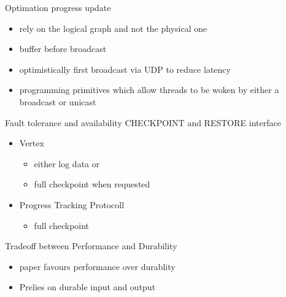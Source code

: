 \begin{frame}[t]{Optimation progress update}
  \vspace{0.15cm}
   \begin{itemize}
     \item rely on the logical graph and not the physical one
     \item buffer before broadcast
	 \item optimistically first broadcast via UDP to reduce latency
     \item programming primitives which allow threads to be woken by either a broadcast or unicast
   \end{itemize}

\end{frame}

 \begin{frame}[t]{Fault tolerance and availability}
  \vspace{0.15cm}
  CHECKPOINT and RESTORE interface
   \begin{itemize}
     \item Vertex
	 \begin{itemize}
	 	\item either log data or
        \item full checkpoint when requested
	 \end{itemize}
     \item Progress Tracking Protocoll
     \begin{itemize}
     	\item full checkpoint
     \end{itemize}
   \end{itemize}

\end{frame}


 \begin{frame}[t]{}
  \vspace{0.15cm}
Tradeoff between Performance and Durability
   \begin{itemize}
     \item paper favours performance over durablity
     \item Prelies on durable input and output
   \end{itemize}

\end{frame}

